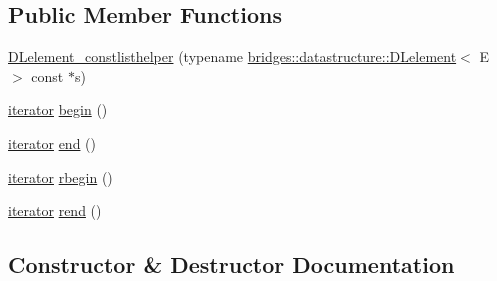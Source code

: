\subsection*{Public Member Functions}
\begin{DoxyCompactItemize}
\item 
\hyperlink{classbridges_1_1datastructure_1_1_d_lelement_1_1_d_lelement__constlisthelper_a2c05f3f43826108552aa8bd325b48753}{D\+Lelement\+\_\+constlisthelper} (typename \hyperlink{classbridges_1_1datastructure_1_1_d_lelement}{bridges\+::datastructure\+::\+D\+Lelement}$<$ E $>$ const $\ast$s)
\item 
\hyperlink{classbridges_1_1datastructure_1_1_d_lelement_1_1_d_lelement__constlisthelper_1_1iterator}{iterator} \hyperlink{classbridges_1_1datastructure_1_1_d_lelement_1_1_d_lelement__constlisthelper_a84507b186afcf37d5c11c341f37b74de}{begin} ()
\item 
\hyperlink{classbridges_1_1datastructure_1_1_d_lelement_1_1_d_lelement__constlisthelper_1_1iterator}{iterator} \hyperlink{classbridges_1_1datastructure_1_1_d_lelement_1_1_d_lelement__constlisthelper_a3caced1b593034beee0fa105e1f7a663}{end} ()
\item 
\hyperlink{classbridges_1_1datastructure_1_1_d_lelement_1_1_d_lelement__constlisthelper_1_1iterator}{iterator} \hyperlink{classbridges_1_1datastructure_1_1_d_lelement_1_1_d_lelement__constlisthelper_a81828d8ccd860b62812dd4b824df1a06}{rbegin} ()
\item 
\hyperlink{classbridges_1_1datastructure_1_1_d_lelement_1_1_d_lelement__constlisthelper_1_1iterator}{iterator} \hyperlink{classbridges_1_1datastructure_1_1_d_lelement_1_1_d_lelement__constlisthelper_a1085a069b94d7d78f81de9764e4db6b4}{rend} ()
\end{DoxyCompactItemize}


\subsection{Constructor \& Destructor Documentation}
\mbox{\label{classbridges_1_1datastructure_1_1_d_lelement_1_1_d_lelement__constlisthelper_a2c05f3f43826108552aa8bd325b48753}} 
